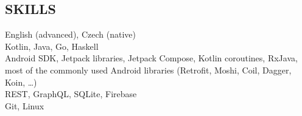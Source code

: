 \documentclass[margin]{res}
\begin{document}
\begin{resume}
        \onehalfspacing
        \section{SKILLS}
        English (advanced), Czech (native)\\
        Kotlin, Java, Go, Haskell \\
        Android SDK, Jetpack libraries, Jetpack Compose, Kotlin coroutines, RxJava,
        most of the commonly used Android libraries (Retrofit, Moshi, Coil, Dagger, Koin, \ldots) \\
        REST, GraphQL, SQLite, Firebase \\
        Git, Linux

    \end{resume}
\end{document}
